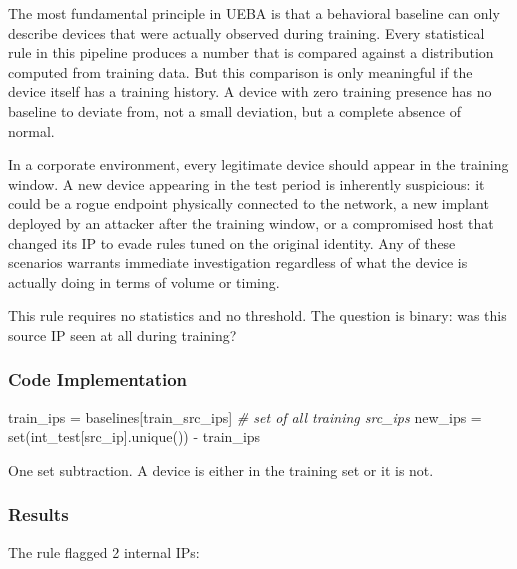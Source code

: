 \documentclass[
  11pt,
]{article}
\newenvironment{Shaded}{\vspace{4pt}}{\vspace{4pt}}
\newcommand{\BuiltInTok}[1]{\textcolor[rgb]{0.00,0.50,0.00}{#1}}
\newcommand{\CommentTok}[1]{\textcolor[rgb]{0.38,0.63,0.69}{\textit{#1}}}
\newcommand{\NormalTok}[1]{#1}
\newcommand{\OperatorTok}[1]{\textcolor[rgb]{0.40,0.40,0.40}{#1}}
\newcommand{\StringTok}[1]{\textcolor[rgb]{0.25,0.44,0.63}{#1}}
\begin{document}
The most fundamental principle in UEBA is that a behavioral baseline can
only describe devices that were actually observed during training. Every
statistical rule in this pipeline produces a number that is compared
against a distribution computed from training data. But this comparison
is only meaningful if the device itself has a training history. A device
with zero training presence has no baseline to deviate from, not a small
deviation, but a complete absence of normal.

In a corporate environment, every legitimate device should appear in the
training window. A new device appearing in the test period is inherently
suspicious: it could be a rogue endpoint physically connected to the
network, a new implant deployed by an attacker after the training
window, or a compromised host that changed its IP to evade rules tuned
on the original identity. Any of these scenarios warrants immediate
investigation regardless of what the device is actually doing in terms
of volume or timing.

This rule requires no statistics and no threshold. The question is
binary: was this source IP seen at all during training?

\hypertarget{code-implementation-1}{%
\subsubsection{Code Implementation}\label{code-implementation-1}}

\begin{Shaded}
\begin{Highlighting}[]
\NormalTok{train\_ips }\OperatorTok{=}\NormalTok{ baselines[}\StringTok{\textquotesingle{}train\_src\_ips\textquotesingle{}}\NormalTok{]                  }\CommentTok{\# set of all training src\_ips}
\NormalTok{new\_ips   }\OperatorTok{=} \BuiltInTok{set}\NormalTok{(int\_test[}\StringTok{\textquotesingle{}src\_ip\textquotesingle{}}\NormalTok{].unique()) }\OperatorTok{{-}}\NormalTok{ train\_ips}
\end{Highlighting}
\end{Shaded}

One set subtraction. A device is either in the training set or it is not.

\hypertarget{results}{%
\subsubsection{Results}\label{results}}

The rule flagged 2 internal IPs:
\end{document}
